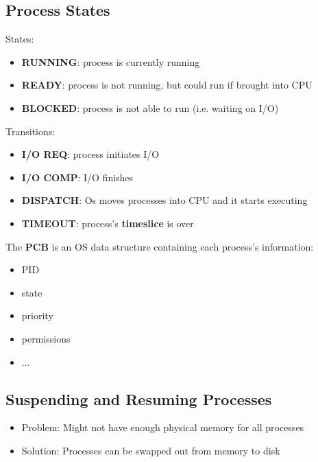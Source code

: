\documentclass{article}
\begin{document}
\subsection{Process States}

States:
\begin{itemize}
	\item \textbf{RUNNING}: process is currently running
	\item \textbf{READY}: process is not running, but could run if brought into CPU
	\item \textbf{BLOCKED}: process is not able to run (i.e. waiting on I/O)
\end{itemize}

Transitions:
\begin{itemize}
	\item \textbf{I/O REQ}: process initiates I/O
	\item \textbf{I/O COMP}: I/O finishes
	\item \textbf{DISPATCH}: Os moves processes into CPU and it starts executing
	\item \textbf{TIMEOUT}: process's \textbf{timeslice} is over
\end{itemize}

\begin{definition}
	The \textbf{PCB} is an OS data structure containing each process's information:
	\begin{itemize}
		\item PID
		\item state
		\item priority
		\item permissions
		\item ...
	\end{itemize}
\end{definition}

\subsection{Suspending and Resuming Processes}

\begin{itemize}
	\item Problem: Might not have enough physical memory for all processes
	\item Solution: Processes can be swapped out from memory to disk
\end{itemize}
\end{document}
